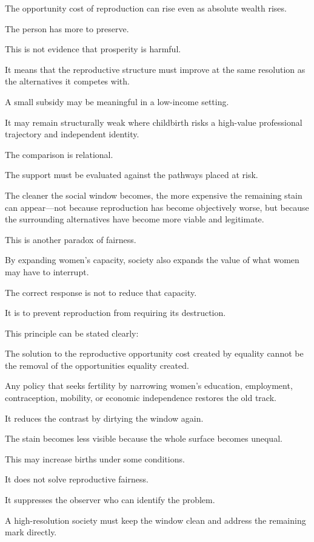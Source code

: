 The opportunity cost of reproduction can rise even as absolute wealth rises.

The person has more to preserve.

This is not evidence that prosperity is harmful.

It means that the reproductive structure must improve at the same resolution as the alternatives it competes with.

A small subsidy may be meaningful in a low-income setting.

It may remain structurally weak where childbirth risks a high-value professional trajectory and independent identity.

The comparison is relational.

The support must be evaluated against the pathways placed at risk.

The cleaner the social window becomes, the more expensive the remaining stain can appear—not because reproduction has become objectively worse, but because the surrounding alternatives have become more viable and legitimate.

This is another paradox of fairness.

By expanding women’s capacity, society also expands the value of what women may have to interrupt.

The correct response is not to reduce that capacity.

It is to prevent reproduction from requiring its destruction.

This principle can be stated clearly:

The solution to the reproductive opportunity cost created by equality cannot be the removal of the opportunities equality created.

Any policy that seeks fertility by narrowing women’s education, employment, contraception, mobility, or economic independence restores the old track.

It reduces the contrast by dirtying the window again.

The stain becomes less visible because the whole surface becomes unequal.

This may increase births under some conditions.

It does not solve reproductive fairness.

It suppresses the observer who can identify the problem.

A high-resolution society must keep the window clean and address the remaining mark directly.

